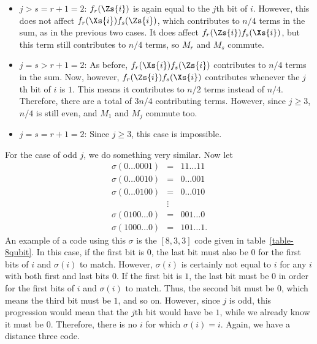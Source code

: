 \begin{itemize}
	\item $j > s = r+1 = 2$: $f_r (\Zs{i})$ is again equal to the $j$th bit of
	$i$.  However, this does not affect $f_r (\Xs{i}) f_s (\Zs{i})$, which
	contributes to $n/4$ terms in the sum, as in the previous two cases.  It does
	affect $f_r (\Zs{i}) f_s (\Xs{i})$, but this term still contributes to $n/4$
	terms, so $M_r$ and $M_s$ commute.

	\item $j = s > r+1 = 2$: As before, $f_r (\Xs{i}) f_s (\Zs{i})$ contributes to
	$n/4$ terms in the sum.  Now, however, $f_r (\Zs{i}) f_s (\Xs{i})$ contributes
	whenever the $j$th bit of $i$ is $1$.  This means it contributes to $n/2$
	terms instead of $n/4$.  Therefore, there are a total of $3n/4$ contributing
	terms.  However, since $j \geq 3$, $n/4$ is still even, and $M_1$ and
	$M_j$ commute too.

	\item $j = s = r+1 = 2$: Since $j \geq 3$, this case is impossible.
\end{itemize}

For the case of odd $j$, we do something very similar.  Now let
\begin{eqnarray}
	\sigma (0 \ldots 0 0 0 1) & = & 1 1 \ldots 1 1  \nonumber \\
	\sigma (0 \ldots 0 0 1 0) & = & 0 \ldots 0 0 1 \nonumber \\
	\sigma (0 \ldots 0 1 0 0) & = & 0 \ldots 0 1 0 \label{eq-sigma-odd}\\
	& \vdots & \nonumber \\
	\sigma (0 1 0 0 \ldots 0) & = & 0 0 1 \ldots 0 \nonumber \\
	\sigma (1 0 0 0 \ldots 0) & = & 1 0 1 \ldots 1. \nonumber
\end{eqnarray}
An example of a code using this $\sigma$ is the $[8,3,3]$ code given in
table~\ref{table-8qubit}.  In this case, if the first bit is 0, the last bit
must also be 0 for the first bits of $i$ and $\sigma(i)$ to match.  However,
$\sigma (i)$ is certainly not equal to $i$ for any $i$ with both first and last
bits $0$.  If the first bit is $1$, the last bit must be $0$ in order for the
first bits of $i$ and $\sigma (i)$ to match. Thus, the second bit must be $0$,
which means the third bit must be $1$, and so on.  However, since $j$ is odd,
this progression would mean that the $j$th bit would have be $1$, while we
already know it must be $0$.
Therefore, there is no $i$ for which $\sigma (i) = i$.  Again, we have a
distance three code.

